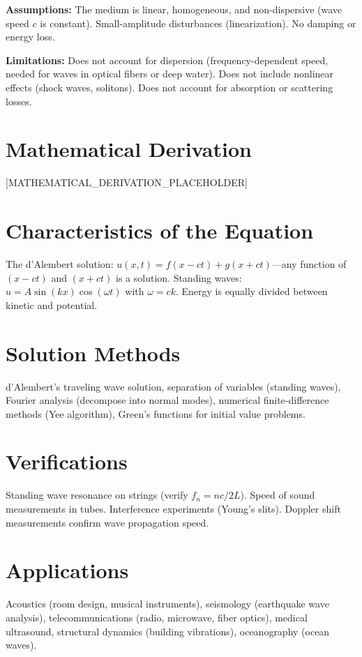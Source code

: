 \documentclass[11pt,openright]{book}
\begin{document}
\textbf{Assumptions:} The medium is linear, homogeneous, and non-dispersive (wave speed $c$ is constant). Small-amplitude disturbances (linearization). No damping or energy loss.


\textbf{Limitations:} Does not account for dispersion (frequency-dependent speed, needed for waves in optical fibers or deep water). Does not include nonlinear effects (shock waves, solitons). Does not account for absorption or scattering losses.


\section*{Mathematical Derivation}

[MATHEMATICAL_DERIVATION_PLACEHOLDER]

\section*{Characteristics of the Equation}

The d'Alembert solution: $u(x,t) = f(x - ct) + g(x + ct)$---any function of $(x - ct)$ and $(x + ct)$ is a solution. Standing waves: $u = A \sin(kx)\cos(\omega t)$ with $\omega = ck$. Energy is equally divided between kinetic and potential.
\section*{Solution Methods}

d'Alembert's traveling wave solution, separation of variables (standing waves), Fourier analysis (decompose into normal modes), numerical finite-difference methods (Yee algorithm), Green's functions for initial value problems.
\section*{Verifications}

Standing wave resonance on strings (verify $f_n = nc/2L$). Speed of sound measurements in tubes. Interference experiments (Young's slits). Doppler shift measurements confirm wave propagation speed.
\section*{Applications}

Acoustics (room design, musical instruments), seismology (earthquake wave analysis), telecommunications (radio, microwave, fiber optics), medical ultrasound, structural dynamics (building vibrations), oceanography (ocean waves).
\end{document}
